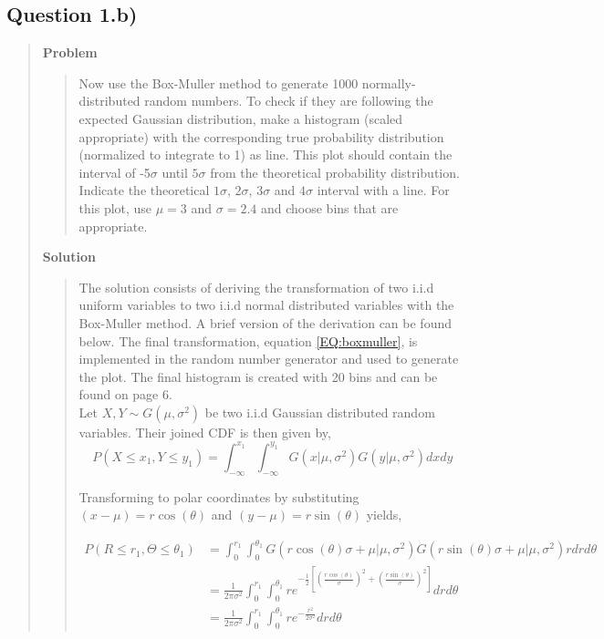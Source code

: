
\subsection*{\textbf{Question 1.b)}}
\begin{quote}

\textbf{Problem}
\begin{quote}Now use the Box-Muller method to generate 1000 normally-distributed random numbers. To check if they are following the expected Gaussian distribution, make a histogram (scaled appropriate) with the corresponding true probability distribution (normalized to integrate to 1) as line. This plot should contain the interval of -5$\sigma$ until $5\sigma$ from the theoretical probability distribution. Indicate the theoretical $1\sigma$, $2\sigma$, $3\sigma$ and $4\sigma$ interval with a line. For this plot, use $\mu =3$ and $\sigma = 2.4$ and choose bins that are appropriate.
\end{quote}

\textbf{Solution} 



\begin{quote}
The solution consists of deriving the  transformation of two i.i.d uniform variables to two i.i.d normal distributed variables with the Box-Muller method. A brief version of the derivation can be found below. The final transformation, equation \ref{EQ:boxmuller}, is  implemented in the random number generator and used to generate the plot. The final histogram is created with 20 bins and can be found on page 6.
\\


Let $X, Y \sim G(\mu, \sigma ^2)$ be two i.i.d Gaussian distributed random variables. Their joined CDF is then given by, 
\begin{equation}
P(X \leq x_1, Y \leq y_1) =  \int_{-\infty}^{x_1} \int_{-\infty}^{y_1} G(x| \mu, \sigma^2) G(y| \mu, \sigma^2) dx dy
\end{equation}

Transforming to polar coordinates by substituting $ (x-\mu) = r \cos(\theta)$ and $ (y-\mu) = r\sin(\theta)$ yields,

\begin{align*}
P(R \leq r_1, \Theta \leq \theta_1) &= \int_0^{r_1} \int_{0}^{\theta_1} G(r\cos(\theta) \sigma + \mu| \mu, \sigma^2) G(r\sin(\theta) \sigma + \mu| \mu, \sigma^2) r dr d\theta \\
&= \frac{1}{2 \pi \sigma^2} \int_0^{r_1} \int_{0}^{\theta_1} re^{ -\frac{1}{2} \left[ \left( \frac{r\cos(\theta)}{\sigma} \right)^2  + \left( \frac{r\sin(\theta)}{\sigma} \right)^2 \right]}  dr d\theta \\
&=  \frac{1}{2 \pi \sigma^2} \int_0^{r_1} \int_{0}^{\theta_1} re^{ -\frac{r^2}{2 \sigma ^2} } dr d\theta
\end{align*}


\end{quote}
\end{quote}
